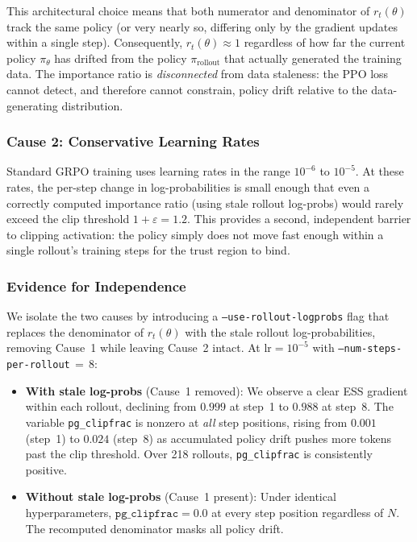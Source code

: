 This architectural choice means that both numerator and denominator of $r_t(\theta)$ track the same policy (or very nearly so, differing only by the gradient updates within a single step).
Consequently, $r_t(\theta) \approx 1$ regardless of how far the current policy $\pi_\theta$ has drifted from the policy $\pi_{\text{rollout}}$ that actually generated the training data.
The importance ratio is \emph{disconnected} from data staleness: the PPO loss cannot detect, and therefore cannot constrain, policy drift relative to the data-generating distribution.

\subsubsection{Cause 2: Conservative Learning Rates}
\label{sec:cause-lr}

Standard GRPO training uses learning rates in the range $10^{-6}$ to $10^{-5}$.
At these rates, the per-step change in log-probabilities is small enough that even a correctly computed importance ratio (using stale rollout log-probs) would rarely exceed the clip threshold $1 + \varepsilon = 1.2$.
This provides a second, independent barrier to clipping activation: the policy simply does not move fast enough within a single rollout's training steps for the trust region to bind.

\subsubsection{Evidence for Independence}
\label{sec:evidence-independence}

We isolate the two causes by introducing a \texttt{--use-rollout-logprobs} flag that replaces the denominator of $r_t(\theta)$ with the stale rollout log-probabilities, removing Cause~1 while leaving Cause~2 intact.
At $\text{lr} = 10^{-5}$ with \texttt{--num-steps-per-rollout}$\,{=}\,8$:

\begin{itemize}
    \item \textbf{With stale log-probs} (Cause~1 removed): We observe a clear ESS gradient within each rollout, declining from $0.999$ at step~1 to $0.988$ at step~8.
    The variable \texttt{pg\_clipfrac} is nonzero at \emph{all} step positions, rising from $0.001$ (step~1) to $0.024$ (step~8) as accumulated policy drift pushes more tokens past the clip threshold.
    Over 218 rollouts, \texttt{pg\_clipfrac} is consistently positive.

    \item \textbf{Without stale log-probs} (Cause~1 present): Under identical hyperparameters, $\texttt{pg\_clipfrac} = 0.0$ at every step position regardless of $N$.
    The recomputed denominator masks all policy drift.
\end{itemize}

